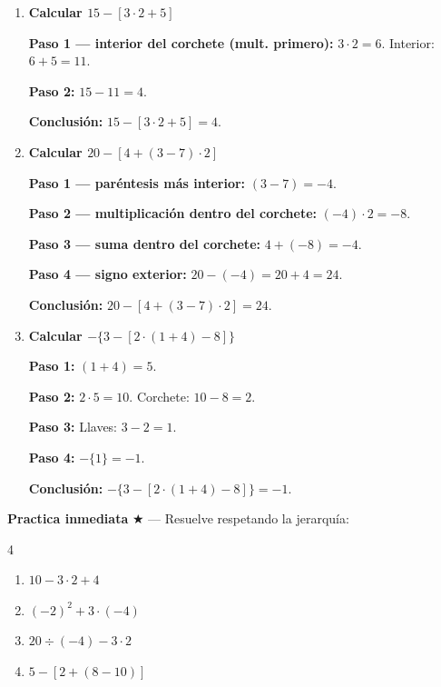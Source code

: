 \documentclass[11pt, letterpaper]{article}
\begin{document}
\begin{tcolorbox}[examplebox, title={Ejemplos --- par\'entesis anidados paso a paso}]
\begin{enumerate}[label=\textbf{Ej. \arabic*.}, leftmargin=*, itemsep=12pt]

\item \textbf{Calcular $15-[3\cdot 2+5]$}

\textbf{Paso 1 --- interior del corchete (mult. primero):} $3\cdot 2=6$. Interior: $6+5=11$.

\textbf{Paso 2:} $15-11=4$.

\textbf{Conclusi\'on:} $15-[3\cdot 2+5]=4$.

\item \textbf{Calcular $20-[4+(3-7)\cdot 2]$}

\textbf{Paso 1 --- par\'entesis m\'as interior:} $(3-7)=-4$.

\textbf{Paso 2 --- multiplicaci\'on dentro del corchete:} $(-4)\cdot 2=-8$.

\textbf{Paso 3 --- suma dentro del corchete:} $4+(-8)=-4$.

\textbf{Paso 4 --- signo exterior:} $20-(-4)=20+4=24$.

\textbf{Conclusi\'on:} $20-[4+(3-7)\cdot 2]=24$.

\item \textbf{Calcular $-\{3-[2\cdot(1+4)-8]\}$}

\textbf{Paso 1:} $(1+4)=5$.

\textbf{Paso 2:} $2\cdot 5=10$. Corchete: $10-8=2$.

\textbf{Paso 3:} Llaves: $3-2=1$.

\textbf{Paso 4:} $-\{1\}=-1$.

\textbf{Conclusi\'on:} $-\{3-[2\cdot(1+4)-8]\}=-1$.

\end{enumerate}
\end{tcolorbox}

\medskip
\textbf{Practica inmediata} \quad $\bigstar$ --- Resuelve respetando la jerarqu\'ia:
\begin{multicols}{4}
\begin{enumerate}[label=\alph*), leftmargin=*]
  \item $10-3\cdot 2+4$
  \item $(-2)^2+3\cdot(-4)$
  \item $20\div(-4)-3\cdot 2$
  \item $5-[2+(8-10)]$
\end{enumerate}
\end{multicols}
\end{document}
